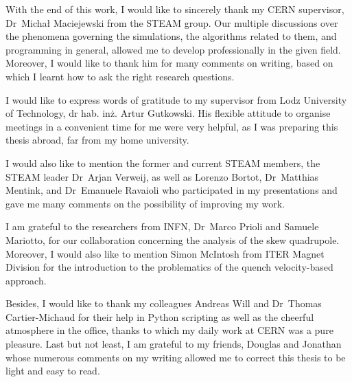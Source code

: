 
With the end of this work, I would like to sincerely thank my CERN supervisor, Dr~Michał Maciejewski from the STEAM group. Our multiple discussions over the phenomena governing the simulations, the algorithms related to them, and programming in general, allowed me to develop professionally in the given field. Moreover, I would like to thank him for many comments on writing, based on which I learnt how to ask the right research questions.

I would like to express words of gratitude to my supervisor from Lodz University of Technology, dr hab. inż. Artur Gutkowski. His flexible attitude to organise meetings in a convenient time for me were very helpful, as I was preparing this thesis abroad, far from my home university.

I would also like to mention the former and current STEAM members, the STEAM leader Dr~Arjan Verweij, as well as Lorenzo Bortot, Dr~Matthias Mentink, and Dr~Emanuele Ravaioli who participated in my presentations and gave me many comments on the possibility of improving my work.

I am grateful to the researchers from INFN, Dr~Marco Prioli and Samuele Mariotto, for our collaboration concerning the analysis of the skew quadrupole. Moreover, I would also like to mention Simon McIntosh from ITER Magnet Division for the introduction to the problematics of the quench velocity-based approach. 

Besides, I would like to thank my colleagues Andreas Will and Dr~Thomas Cartier-Michaud for their help in Python scripting as well as the cheerful atmosphere in the office, thanks to which my daily work at CERN was a pure pleasure. Last but not least, I am grateful to my friends, Douglas and Jonathan whose numerous comments on my writing allowed me to correct this thesis to be light and easy to read.
